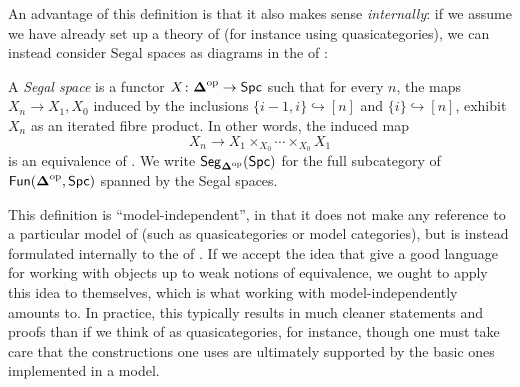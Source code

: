 \documentclass[a4paper,11pt]{article}
\begin{document}
An advantage of this definition is that it also makes sense
\emph{internally}: if we assume we have already set up a theory of
\icats{} (for instance using quasicategories), we can instead consider
Segal spaces as diagrams in the \icat{} of \igpds{}:
\begin{defn}
  A \emph{Segal space} is a functor $X \colon \Dop \to \Spc$ such
  that for every $n$, the maps $X_{n} \to X_{1}, X_{0}$ induced by the
  inclusions $\{i-1,i\} \hookrightarrow [n]$ and
  $\{i\} \hookrightarrow [n]$, exhibit $X_{n}$ as an iterated
  fibre
  product.  In other words, the induced map
  \[ X_{n} \to X_{1} \times_{X_{0}} \cdots \times_{X_{0}}
    X_{1}\] is an equivalence of \igpds{}. We write $\textup{\textsf{Seg}}_{\boldsymbol{\Delta}^{\text{\textup{op}}}}(\textup{\textsf{Spc}})$ for
  the full subcategory of $\textup{\textsf{Fun}}(\boldsymbol{\Delta}^{\text{\textup{op}}}, \textup{\textsf{Spc}})$ spanned by the Segal spaces.
\end{defn}
\begin{remark}
  This definition is ``model-independent'', in that it does not make
  any reference to a particular model of \icats{} (such as
  quasicategories or model categories), but is instead formulated
  internally to the \icat{} of \icats{}. If we accept the idea that
  \icats{} give a good language for working with objects up to weak
  notions of equivalence, we ought to apply this idea to \icats{}
  themselves, which is what working with \icats{} model-independently
  amounts to. In practice, this typically results in much cleaner
  statements and proofs than if we think of \icats{} as
  quasicategories, for instance, though one must take care that the
  constructions one uses are ultimately supported by the basic ones
  implemented in a model.
\end{remark}
\end{document}
